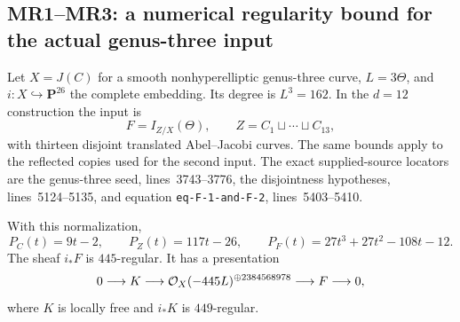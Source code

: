 \subsection*{MR1--MR3: a numerical regularity bound for the actual genus-three input}
Let $X=J(C)$ for a smooth nonhyperelliptic genus-three curve, $L=3\Theta$, and $i:X\hookrightarrow\mathbf P^{26}$ the complete embedding. Its degree is $L^3=162$. In the $d=12$ construction the input is
\[
 F=I_{Z/X}(\Theta),\qquad Z=C_1\sqcup\cdots\sqcup C_{13},
\]
with thirteen disjoint translated Abel--Jacobi curves. The same bounds apply to the reflected copies used for the second input. The exact supplied-source locators are the genus-three seed, lines~3743--3776, the disjointness hypotheses, lines~5124--5135, and equation \texttt{eq-F-1-and-F-2}, lines~5403--5410.

\begin{proposition}\label{MR}
With this normalization,
\[
 P_C(t)=9t-2,\qquad P_Z(t)=117t-26,\qquad
 P_F(t)=27t^3+27t^2-108t-12.
\]
The sheaf $i_*F$ is $445$-regular. It has a presentation
\begin{equation}\label{eq:inputpresentation}
 0\longrightarrow K\longrightarrow
 \mathcal O_X(-445L)^{\oplus 2384568978}\longrightarrow F\longrightarrow0,
\end{equation}
where $K$ is locally free and $i_*K$ is $449$-regular.
\end{proposition}
